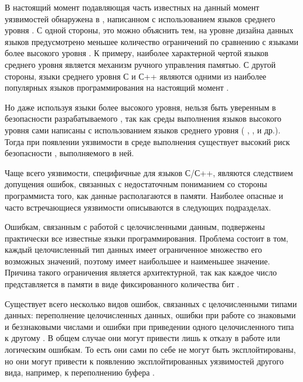 %
В настоящий момент подавляющая часть известных на данный момент уязвимостей обнаружена в , написанном с использованием языков среднего уровня   . 
%
С одной стороны, это можно объяснить тем, на уровне дизайна данных языков предусмотрено меньшее количество ограничений по сравнению с языками более высокого уровня . 
%
К примеру, наиболее характерной чертой языков среднего уровня является механизм ручного управления памятью. 
%
С другой стороны, языки среднего уровня С  и С++  являются одними из наиболее популярных языков программирования на настоящий момент .

%
Но даже используя языки более высокого уровня, нельзя быть уверенным в безопасности разрабатываемого , так как среды выполнения языков высокого уровня сами написаны с использованием языков среднего уровня ( ,  ,   и др.). 
%
Тогда при появлении уязвимости в среде выполнения существует высокий риск безопасности , выполняемого в ней.

%
Чаще всего уязвимости, специфичные для языков С/С++, являются следствием допущения ошибок, связанных с недостаточным пониманием со стороны программиста того, как данные располагаются в памяти.
%
Наиболее опасные и часто встречающиеся  уязвимости описываются в следующих подразделах. 



%
Ошибкам, связанным с работой с целочисленными данным, подвержены практически все известные языки программирования. 
%
Проблема состоит в том, каждый целочисленный тип данных имеет ограниченное множество его возможных значений, поэтому имеет наибольшее и наименьшее значение. 
%
Причина такого ограничения является архитектурной, так как каждое число представляется в памяти в виде фиксированного количества бит .

%
Существует всего несколько видов ошибок, связанных с целочисленными типами данных: переполнение целочисленных данных, ошибки при работе со знаковыми и беззнаковыми числами и ошибки при приведении одного целочисленного типа к другому   
  . 
%
В общем случае они могут привести лишь к отказу в работе или логическим ошибкам. 
%
То есть они сами по себе не могут быть эксплойтированы, но они могут привести к появлению эксплойтированных уязвимостей другого вида, например, к переполнению буфера . 

